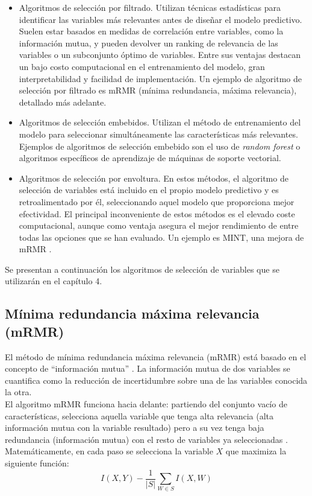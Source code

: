 \begin{itemize}
	\item Algoritmos de selección por filtrado. Utilizan técnicas estadísticas para identificar las variables más relevantes antes de diseñar el modelo predictivo. Suelen estar basados en medidas de correlación entre variables, como la información mutua, y pueden devolver un ranking de relevancia de las variables o un subconjunto óptimo de variables. Entre sus ventajas destacan un bajo costo computacional en el entrenamiento del modelo, gran interpretabilidad y facilidad de implementación. Un ejemplo de algoritmo de selección por filtrado es mRMR (mínima redundancia, máxima relevancia), detallado más adelante. 
	
	\item Algoritmos de selección embebidos. Utilizan el método de entrenamiento del modelo para seleccionar simultáneamente las características más relevantes. Ejemplos de algoritmos de selección embebido son el uso de \textit{random forest} o algoritmos específicos de aprendizaje de máquinas de soporte vectorial. 
	
	\item Algoritmos de selección por envoltura. En estos métodos, el algoritmo de selección de variables está incluido en el propio modelo predictivo y es retroalimentado por él, seleccionando aquel modelo que proporciona mejor efectividad. El principal inconveniente de estos métodos es el elevado coste computacional, aunque como ventaja asegura el mejor rendimiento de entre todas las opciones que se han evaluado. Un ejemplo es MINT, una mejora de mRMR \cite{He2016}.
\end{itemize}

Se presentan a continuación los algoritmos de selección de variables que se utilizarán en el capítulo 4.

\subsection{Mínima redundancia máxima relevancia (mRMR)}

El método de mínima redundancia máxima relevancia (mRMR) está basado en el concepto de ``información mutua'' \cite{Koller1996}. La información mutua de dos variables se cuantifica como la reducción de incertidumbre sobre una de las variables conocida la otra.\\

El algoritmo mRMR funciona hacia delante: partiendo del conjunto vacío de características, selecciona aquella variable que tenga alta relevancia (alta información mutua con la variable resultado) pero a su vez tenga baja redundancia (información mutua) con el resto de variables ya seleccionadas \cite{HanchuanPeng2005}. Matemáticamente, en cada paso se selecciona la variable $X$ que maximiza la siguiente función: $$I(X,Y) - \dfrac{1}{\rvert S \rvert} \sum_{W\in S} I(X, W)$$

